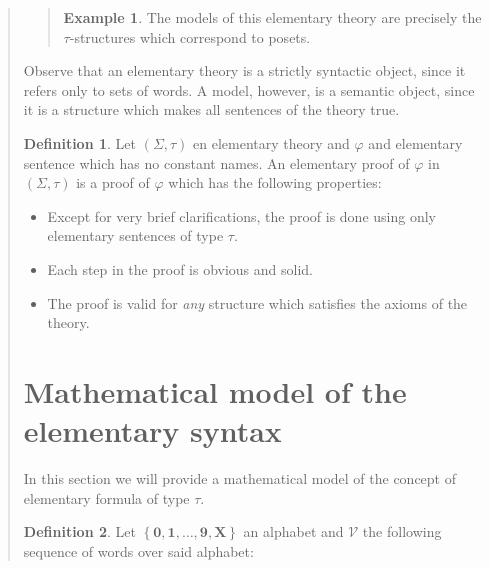 \documentclass[a4paper, 12pt]{article}
\theoremstyle{definition}
\theoremstyle{definition}
\newtheorem{example}{Example}
\theoremstyle{definition}
\newtheorem{definition}{Definition}
\begin{document}
\begin{quote}
\begin{quote}
\begin{example}
    The models of this elementary theory are precisely the $\tau$-structures 
    which correspond to posets.

\end{example}


\end{quote}
\normalsize

Observe that an elementary theory is a strictly syntactic object, since it
refers only to sets of words. A model, however, is a semantic object, since it
is a structure which makes all sentences of the theory true.

\begin{definition}
    Let $(\Sigma, \tau)$ en elementary theory and $\varphi$ and elementary 
    sentence which has no constant names. An elementary 
    proof of $\varphi$ in $(\Sigma, \tau)$ is a proof of $\varphi$
    which has the following properties: 

    \begin{itemize}
        \item Except for very brief clarifications, the proof is done using 
            only elementary sentences of type $\tau$.
        \item Each step in the proof is obvious and solid. 
        \item The proof is valid for \textit{any} structure which satisfies 
            the axioms of the theory.
    \end{itemize}
\end{definition}

\pagebreak 

\section{Mathematical model of the elementary syntax}

In this section we will provide a mathematical model of the concept of 
elementary formula of type $\tau$.

\begin{definition}
    Let $\left\{ \textbf{0}, \textbf{1}, \ldots, \textbf{9}, \textbf{X}
    \right\} $ an alphabet and $\mathcal{V}$ the following sequence of words
    over said alphabet:


\end{definition}
\end{quote}
\end{document}
